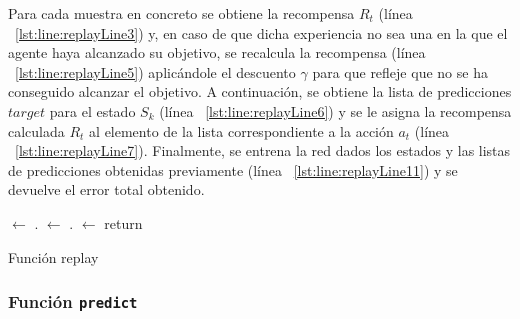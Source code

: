 Para cada muestra en concreto se obtiene la recompensa $R_t$ (línea ~\ref{lst:line:replayLine3}) y, en caso de que dicha experiencia no sea una en la que el agente haya alcanzado su objetivo, se recalcula la recompensa (línea ~\ref{lst:line:replayLine5}) aplicándole el descuento $\gamma$ para que refleje que no se ha conseguido alcanzar el objetivo. A continuación, se obtiene la lista de predicciones $target$ para el estado $S_k$ (línea ~\ref{lst:line:replayLine6}) y se le asigna la recompensa calculada $R_t$ al elemento de la lista correspondiente a la acción $a_t$ (línea ~\ref{lst:line:replayLine7}). Finalmente, se entrena la red dados los estados y las listas de predicciones obtenidas previamente (línea ~\ref{lst:line:replayLine11}) y se devuelve el error total obtenido.  \\
\begin{algorithm}[H]
\SetAlgoLined
{}
\BlankLine
\Minibatch $\leftarrow$ \Random.\Sample{\Memory, \Batchsize}\;\label{lst:line:replayLine2}
\History $\leftarrow$ \Model.\Fit{\States, \Targets}\;\label{lst:line:replayLine11}
\Loss $\leftarrow$ \History[$'loss'$]\;
return \Loss\;
 \caption{Función replay} \label{replayAlgorithm}
\end{algorithm}

\subsubsection{Función \texttt{predict}}

